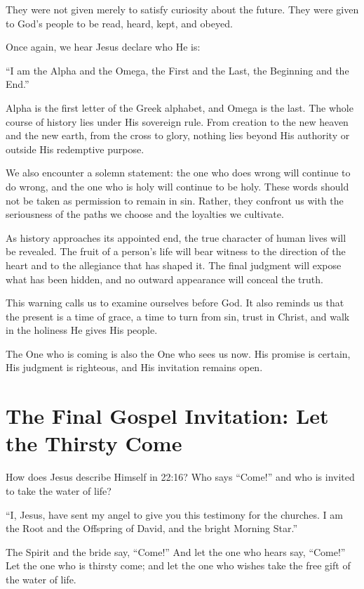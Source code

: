 They were not given merely to satisfy curiosity about the future. They were given to God's people to be read, heard, kept, and obeyed.


Once again, we hear Jesus declare who He is:

``I am the Alpha and the Omega, the First and the Last, the Beginning and the End.''

Alpha is the first letter of the Greek alphabet, and Omega is the last. The whole course of history lies under His sovereign rule. From creation to the new heaven and the new earth, from the cross to glory, nothing lies beyond His authority or outside His redemptive purpose.

We also encounter a solemn statement: the one who does wrong will continue to do wrong, and the one who is holy will continue to be holy. These words should not be taken as permission to remain in sin. Rather, they confront us with the seriousness of the paths we choose and the loyalties we cultivate.

As history approaches its appointed end, the true character of human lives will be revealed. The fruit of a person's life will bear witness to the direction of the heart and to the allegiance that has shaped it. The final judgment will expose what has been hidden, and no outward appearance will conceal the truth.

This warning calls us to examine ourselves before God. It also reminds us that the present is a time of grace, a time to turn from sin, trust in Christ, and walk in the holiness He gives His people.

The One who is coming is also the One who sees us now. His promise is certain, His judgment is righteous, and His invitation remains open.

\section{The Final Gospel Invitation: Let the Thirsty Come}

\begin{ScriptureBox2}{How does Jesus describe Himself in 22:16? Who says ``Come!'' and who is invited to take the water of life?}

\item[22:16] ``I, Jesus, have sent my angel to give you this testimony for the churches. I am the Root and the Offspring of David, and the bright Morning Star.''

\item[22:17] The Spirit and the bride say, ``Come!'' And let the one who hears say, ``Come!'' Let the one who is thirsty come; and let the one who wishes take the free gift of the water of life.

\end{ScriptureBox2}

